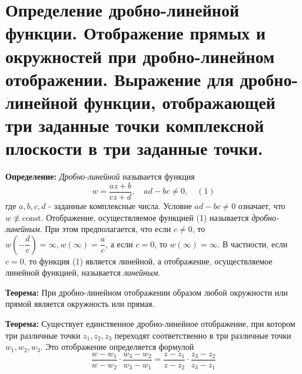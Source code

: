 \section{Определение дробно-линейной функции. Отображение прямых и
окружностей при дробно-линейном отображении. Выражение для
дробно-линейной функции, отображающей три заданные точки комплексной
плоскости в три заданные
точки.}\label{ux43eux43fux440ux435ux434ux435ux43bux435ux43dux438ux435-ux434ux440ux43eux431ux43dux43e-ux43bux438ux43dux435ux439ux43dux43eux439-ux444ux443ux43dux43aux446ux438ux438.-ux43eux442ux43eux431ux440ux430ux436ux435ux43dux438ux435-ux43fux440ux44fux43cux44bux445-ux438-ux43eux43aux440ux443ux436ux43dux43eux441ux442ux435ux439-ux43fux440ux438-ux434ux440ux43eux431ux43dux43e-ux43bux438ux43dux435ux439ux43dux43eux43c-ux43eux442ux43eux431ux440ux430ux436ux435ux43dux438ux438.-ux432ux44bux440ux430ux436ux435ux43dux438ux435-ux434ux43bux44f-ux434ux440ux43eux431ux43dux43e-ux43bux438ux43dux435ux439ux43dux43eux439-ux444ux443ux43dux43aux446ux438ux438-ux43eux442ux43eux431ux440ux430ux436ux430ux44eux449ux435ux439-ux442ux440ux438-ux437ux430ux434ux430ux43dux43dux44bux435-ux442ux43eux447ux43aux438-ux43aux43eux43cux43fux43bux435ux43aux441ux43dux43eux439-ux43fux43bux43eux441ux43aux43eux441ux442ux438-ux432-ux442ux440ux438-ux437ux430ux434ux430ux43dux43dux44bux435-ux442ux43eux447ux43aux438.}

\textbf{Определение:} \emph{Дробно-линейной} называется функция \[
w= \frac{az+b}{cz+d},\quad ad-bc\neq 0,\quad(1)
\] где \(a,b,c,d\) - заданные комплексные числа. Условие \(ad-bc\neq 0\)
означает, что \(w\not\equiv \mathrm{const}\). Отображение,
осуществляемое функцией (1) называется \emph{дробно-линейным}. При этом
предполагается, что если \(c\neq 0\), то
\(w\left( -\dfrac{d}{c} \right)=\infty,w(\infty)= \dfrac{a}{c}\), а если
\(c=0\), то \(w(\infty)=\infty\). В частности, если \(c=0\), то функция
(1) является линейной, а отображение, осуществляемое линейной функцией,
называется \emph{линейным}.

\textbf{Теорема:} При дробно-линейном отображении образом любой
окружности или прямой является окружность или прямая.

\textbf{Теорема:} Существует единственное дробно-линейное отображение,
при котором три различные точки \(z_{1},z_{2},z_{3}\) переходят
соответственно в три различные точки \(w_{1},w_{2},w_{3}\). Это
отображение определяется формулой \[
\frac{w-w_{1}}{w-w_{2}}\cdot \frac{w_{3}-w_{2}}{w_{3}-w_{1}}= \frac{z-z_{1}}{z-z_{2}}\cdot \frac{z_{3}-z_{2}}{z_{3}-z_{1}}
\]
